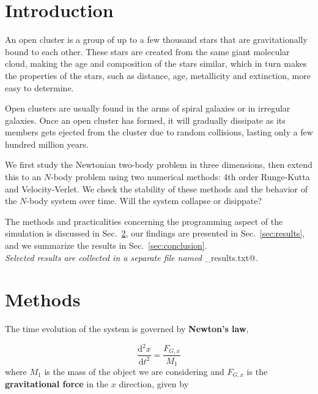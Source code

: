 \documentclass{article}
\begin{document}
\begin{multicols}{2}

\section{Introduction}

An open cluster is a group of up to a few thousand stars that are gravitationally bound to each other. These stars are created from the same giant molecular cloud, making the age and composition of the stars similar, which in turn makes the properties of the stars, such as distance, age, metallicity and extinction, more easy to determine. 

Open clusters are usually found in the arms of spiral galaxies or in irregular galaxies. Once an open cluster has formed, it will gradually dissipate as its members gets ejected from the cluster due to random collisions, lasting only a few hundred million years. 


We first study the Newtonian two-body problem in three dimensions, then extend this to an $N$-body problem using two numerical methods: 4th order Runge-Kutta and Velocity-Verlet. We check the stability of these methods and the behavior of the $N$-body system over time. Will the system collapse or disippate?

The methods and practicalities concerning the programming aspect of the simulation is discussed in Sec.~\ref{sec:methods}, our findings are presented in Sec.~\ref{sec:results}, and we summarize the results in Sec.~\ref{sec:conclusion}. \\

\noindent \textit{Selected results are collected in a separate file named} \verb@selected_results.txt@.



\section{Methods}\label{sec:methods}

The time evolution of the system is governed by \textbf{Newton's law},

\begin{equation}\label{eq:ODE}
	\frac{\mathrm{d}^2 x}{\mathrm{d}t^2} = \frac{F_{G,x}}{M_1}
\end{equation}
where $M_1$ is the mass of the object we are considering and $F_{G,x}$ is the \textbf{gravitational force} in the $x$ direction, given by 


\end{multicols}
\end{document}
